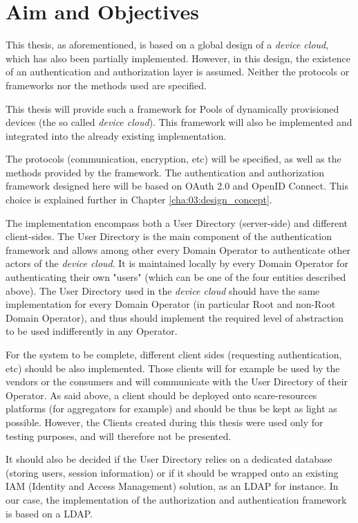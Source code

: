 \section{Aim and Objectives}
This thesis, as aforementioned, is based on a global design of a \emph{device cloud}, which has also been partially implemented. However, in this design, the existence of an authentication and authorization layer is assumed. Neither the protocols or frameworks nor the methods used are specified.

This thesis will provide such a framework for Pools of dynamically provisioned devices (the so called \emph{device cloud}). This framework will also be implemented and integrated into the already existing implementation.

The protocols (communication, encryption, etc) will be specified, as well as the methods provided by the framework. The authentication and authorization framework designed here will be based on OAuth 2.0 and OpenID Connect. This choice is explained further in Chapter \ref{cha:03:design_concept}. 

The implementation encompass both a User Directory (server-side) and different client-sides. The User Directory is the main component of the authentication framework and allows among other every Domain Operator to authenticate other actors of the \emph{device cloud}. It is maintained locally by every Domain Operator for authenticating their own "users" (which can be one of the four entities described above). The User Directory used in the \emph{device cloud} should have the same implementation for every Domain Operator (in particular Root and non-Root Domain Operator), and thus should implement the required level of abstraction to be used indifferently in any Operator.

For the system to be complete, different client sides (requesting authentication, etc) should be also implemented. Those clients will for example be used by the vendors or the consumers and will communicate with the User Directory of their Operator. As said above, a client should be deployed onto scare-resources platforms (for aggregators for example) and should be thus be kept as light as possible. However, the Clients created during this thesis were used only for testing purposes, and will therefore not be presented. 

It should also be decided if the User Directory relies on a dedicated database (storing users, session information) or if it should be wrapped onto an existing IAM (Identity and Access Management) solution, as an LDAP for instance. In our case, the implementation of the authorization and authentication framework is based on a LDAP.

